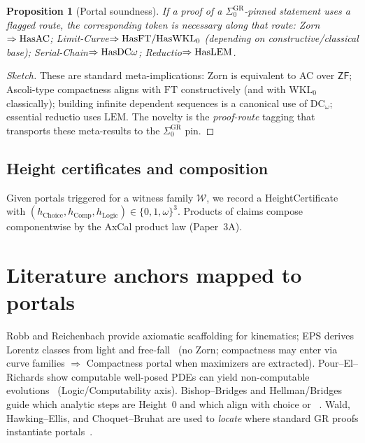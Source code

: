 \documentclass[11pt]{article}
\newtheorem{proposition}[theorem]{Proposition}
\theoremstyle{definition}
\theoremstyle{remark}
\newcommand{\ZF}{\mathsf{ZF}}
\newcommand{\LEM}{\mathrm{LEM}}
\newcommand{\FT}{\mathrm{FT}}
\newcommand{\WKLz}{\mathrm{WKL}_0}
\newcommand{\DCw}{\mathrm{DC}_\omega}
\newcommand{\SigmaZero}{\Sigma_{0}}
\newcommand{\hChoice}{h_{\mathrm{Choice}}}    %
\newcommand{\hComp}{h_{\mathrm{Comp}}}        %
\newcommand{\hLogic}{h_{\mathrm{Logic}}}      %
\begin{document}
\begin{proposition}[Portal soundness]\label{prop:portals}
If a proof of a $\SigmaZero^{\mathrm{GR}}$-pinned statement uses a flagged route, the corresponding token is necessary along that route: Zorn$\Rightarrow{\rm HasAC}$; Limit-Curve$\Rightarrow{\rm HasFT}/{\rm HasWKL}_0$ (depending on constructive/classical base); Serial-Chain$\Rightarrow{\rm HasDC}\omega$; Reductio$\Rightarrow{\rm HasLEM}$.
\end{proposition}

\begin{proof}[Sketch]
These are standard meta-implications: Zorn is equivalent to AC over $\ZF$; Ascoli-type compactness aligns with $\FT$ constructively (and with $\WKLz$ classically); building infinite dependent sequences is a canonical use of $\DCw$; essential reductio uses $\LEM$. The novelty is the \emph{proof-route} tagging that transports these meta-results to the $\SigmaZero^{\mathrm{GR}}$ pin.
\end{proof}

\subsection{Height certificates and composition}
Given portals triggered for a witness family $\mathcal{W}$, we record a HeightCertificate with $(\hChoice,\hComp,\hLogic)\in\{0,1,\omega\}^3$. Products of claims compose componentwise by the AxCal product law (Paper~3A).

\section{Literature anchors mapped to portals}
Robb and Reichenbach provide axiomatic scaffolding for kinematics; EPS derives Lorentz classes from light and free-fall~\cite{Robb1914,Reichenbach1969,EPS1972} (no Zorn; compactness may enter via curve families $\Rightarrow$ Compactness portal when maximizers are extracted). Pour--El--Richards show computable well-posed PDEs can yield non-computable evolutions~\cite{PourElRichards1989} (Logic/Computability axis). Bishop--Bridges and Hellman/Bridges guide which analytic steps are Height~0 and which align with choice or \LEM~\cite{BishopBridges1985,Hellman1998,BridgesReply1995}. Wald, Hawking--Ellis, and Choquet--Bruhat are used to \emph{locate} where standard GR proofs instantiate portals~\cite{Wald1984,HawkingEllis1973,ChoquetBruhat2009}.
\end{document}
